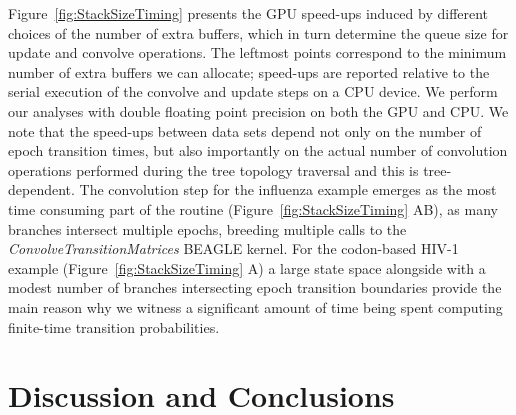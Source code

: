 Figure~\ref{fig:StackSizeTiming} presents the GPU speed-ups induced by different choices of the number of extra buffers, which in turn determine the queue size for update and convolve operations. 
The leftmost points correspond to the minimum number of extra buffers we can allocate; speed-ups are reported relative to the serial execution of the convolve and update steps on a CPU device. We perform our analyses with double floating point precision on both the GPU and CPU.
We note that the speed-ups between data sets depend not only on the number of epoch transition times, but also importantly on the actual number of convolution operations performed during the tree topology traversal and this is tree-dependent. 
The convolution step for the influenza example emerges as the most time consuming part of the routine (Figure~\ref{fig:StackSizeTiming} AB), as many branches intersect multiple epochs, breeding multiple calls to the \emph{ConvolveTransitionMatrices} BEAGLE kernel.  
For the codon-based HIV-1 example (Figure~\ref{fig:StackSizeTiming} A) a large state space alongside with a modest number of branches intersecting epoch transition boundaries provide the main reason why we witness a significant amount of time being spent computing finite-time transition probabilities. 


\section{Discussion and Conclusions}

